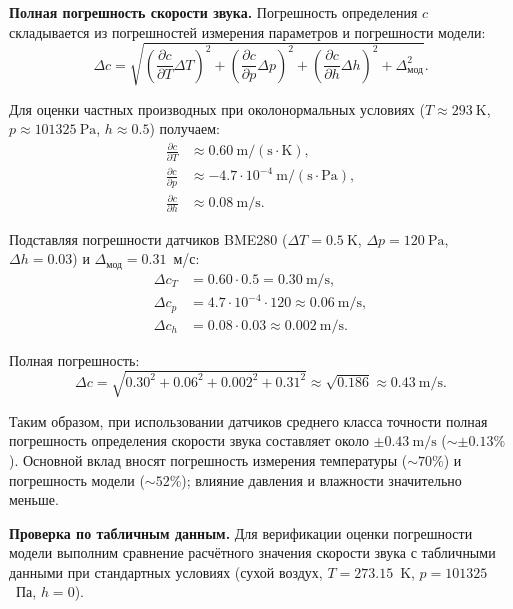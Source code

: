 \textbf{Полная погрешность скорости звука.}
Погрешность определения $c$ складывается из погрешностей измерения параметров и погрешности модели:
\begin{equation}\label{eq:error-propagation}
    \Delta c = \sqrt{\left(\frac{\partial c}{\partial T}\Delta T\right)^2 + \left(\frac{\partial c}{\partial p}\Delta p\right)^2 + \left(\frac{\partial c}{\partial h}\Delta h\right)^2 + \Delta_{\text{мод}}^2}.
\end{equation}

Для оценки частных производных при околонормальных условиях ($T \approx 293\ \mathrm{K}$, $p \approx 101325\ \mathrm{Pa}$, $h \approx 0.5$) получаем:
\begin{align}
    \frac{\partial c}{\partial T} &\approx 0.60\ \mathrm{m/(s\cdot K)}, \\
    \frac{\partial c}{\partial p} &\approx -4.7 \cdot 10^{-4}\ \mathrm{m/(s\cdot Pa)}, \\
    \frac{\partial c}{\partial h} &\approx 0.08\ \mathrm{m/s}.
\end{align}

Подставляя погрешности датчиков BME280 ($\Delta T = 0.5\ \mathrm{K}$, $\Delta p = 120\ \mathrm{Pa}$, $\Delta h = 0.03$) и $\Delta_{\text{мод}} = 0.31$~м/с:
\begin{align}
    \Delta c_T &= 0.60 \cdot 0.5 = 0.30\ \mathrm{m/s}, \\
    \Delta c_p &= 4.7 \cdot 10^{-4} \cdot 120 \approx 0.06\ \mathrm{m/s}, \\
    \Delta c_h &= 0.08 \cdot 0.03 \approx 0.002\ \mathrm{m/s}.
\end{align}

Полная погрешность:
\begin{equation}
    \Delta c = \sqrt{0.30^2 + 0.06^2 + 0.002^2 + 0.31^2} \approx \sqrt{0.186} \approx 0.43\ \mathrm{m/s}.
\end{equation}

Таким образом, при использовании датчиков среднего класса точности полная погрешность определения скорости звука составляет около $\pm 0.43\ \mathrm{m/s}$ ($\sim \pm 0.13\%$). Основной вклад вносят погрешность измерения температуры ($\sim 70\%$) и погрешность модели ($\sim 52\%$); влияние давления и влажности значительно меньше.

\textbf{Проверка по табличным данным.}
Для верификации оценки погрешности модели выполним сравнение расчётного значения скорости звука с табличными данными при стандартных условиях (сухой воздух, $T = 273.15$~K, $p = 101325$~Па, $h = 0$).

